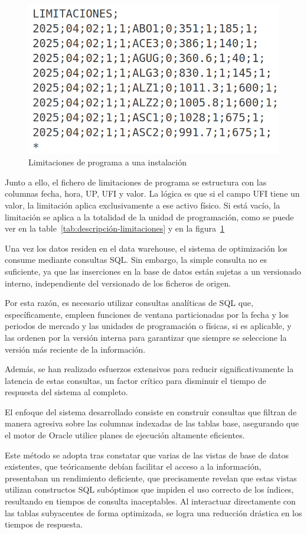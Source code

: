 \begin{figure}
  \centering
  \includegraphics[width=0.5\linewidth]{figures/contenido-limitaciones.png}
  \caption{Limitaciones de programa a una instalación}
  \label{fig:contenido-limitaciones}
\end{figure}

Junto a ello, el fichero de limitaciones de programa se estructura con las columnas fecha, hora, UP, UFI y valor. La lógica es que si el campo UFI tiene un valor, la limitación aplica exclusivamente a ese activo físico. Si está vacío, la limitación se aplica a la totalidad de la unidad de programación, como se puede ver en la table~\ref{tab:descripción-limitaciones} y en la figura~\ref{fig:contenido-limitaciones}

Una vez los datos residen en el data warehouse, el sistema de optimización los consume mediante consultas SQL. Sin embargo, la simple consulta no es suficiente, ya que las inserciones en la base de datos están sujetas a un versionado interno, independiente del versionado de los ficheros de origen.

Por esta razón, es necesario utilizar consultas analíticas de SQL que, específicamente, empleen funciones de ventana particionadas por la fecha y los periodos de mercado y las unidades de programación o físicas, si es aplicable, y las ordenen por la versión interna para garantizar que siempre se seleccione la versión más reciente de la información.

Además, se han realizado esfuerzos extensivos para reducir significativamente la latencia de estas consultas, un factor crítico para disminuir el tiempo de respuesta del sistema al completo.

El enfoque del sistema desarrollado consiste en construir consultas que filtran de manera agresiva sobre las columnas indexadas de las tablas base, asegurando que el motor de Oracle utilice planes de ejecución altamente eficientes.

Este método se adopta tras constatar que varias de las vistas de base de datos existentes, que teóricamente debían facilitar el acceso a la información, presentaban un rendimiento deficiente, que precisamente revelan que estas vistas utilizan constructos SQL subóptimos que impiden el uso correcto de los índices, resultando en tiempos de consulta inaceptables. Al interactuar directamente con las tablas subyacentes de forma optimizada, se logra una reducción drástica en los tiempos de respuesta.

